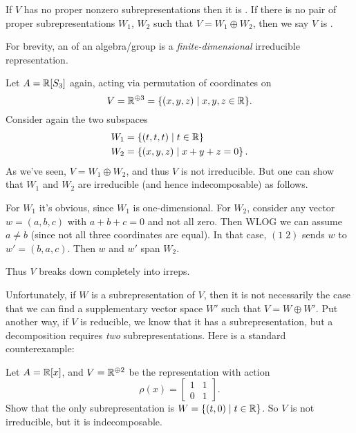 \begin{definition}
	If $V$ has no proper nonzero subrepresentations then it is .
	If there is no pair of proper subrepresentations $W_1$, $W_2$ such that $V = W_1 \oplus W_2$,
	then we say $V$ is .
\end{definition}
\begin{definition}
	For brevity, an  of an algebra/group is a
	\emph{finite-dimensional} irreducible representation.
\end{definition}

\begin{example}
	Let $A = \mathbb R[S_3]$ again, acting via permutation of coordinates on
	\[ V = \mathbb R^{\oplus 3} = \{ (x,y,z) \mid x,y,z \in \mathbb R \}. \]
	Consider again the two subspaces
	\begin{align*}
		W_1 &= \left\{ (t,t,t) \mid t \in \mathbb R \right\} \\
		W_2 &= \left\{ (x,y,z) \mid x+y+z = 0 \right\}.
	\end{align*}
	As we've seen, $V = W_1 \oplus W_2$, and thus $V$ is not irreducible.
	But one can show that $W_1$ and $W_2$ are irreducible
	(and hence indecomposable) as follows.
	\begin{itemize}
		\ii For $W_1$ it's obvious, since $W_1$ is one-dimensional.
		\ii For $W_2$, consider any vector $w = (a,b,c)$
		with $a+b+c=0$ and not all zero.  Then WLOG we can assume $a \neq b$
		(since not all three coordinates are equal).
		In that case, $(1 \; 2)$ sends $w$ to $w' = (b,a,c)$.
		Then $w$ and $w'$ span $W_2$.
	\end{itemize}
	Thus $V$ breaks down completely into irreps.
\end{example}

Unfortunately, if $W$ is a subrepresentation of $V$,
then it is not necessarily the case that we can find a
supplementary vector space $W'$ such that $V = W \oplus W'$.
Put another way, if $V$ is reducible, we know that it has a subrepresentation,
but a decomposition requires \emph{two} subrepresentations.
Here is a standard counterexample:
\begin{exercise}
	\label{exer:irred_not_indecomp}
	Let $A = \mathbb R[x]$, and $V = \mathbb R^{\oplus 2}$ be the representation with action
	\[ \rho(x) = \begin{bmatrix} 1 & 1 \\ 0 & 1 \end{bmatrix}. \]
	Show that the only subrepresentation is $W = \{ (t,0) \mid t \in \mathbb R \}$.
	So $V$ is not irreducible, but it is indecomposable.
\end{exercise}

